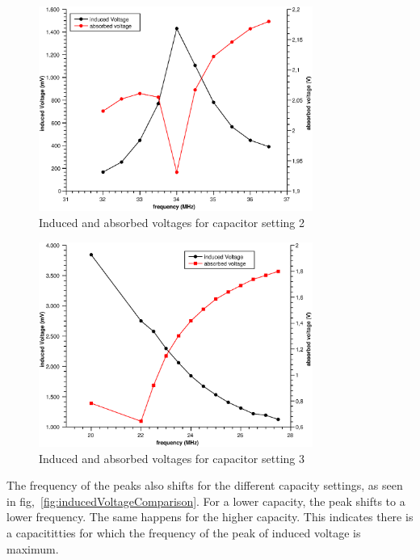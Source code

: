\documentclass{scrartcl}
\begin{document}
\begin{figure}[!ht]
    \centering    
    \includegraphics[width=0.8\textwidth]{Capacitor2.eps}
    \caption{Induced and absorbed voltages for capacitor setting 2}
    \label{fig:VoltageCap2}
\end{figure}

\begin{figure}[!ht]
    \centering    
    \includegraphics[width=0.8\textwidth]{Capacitor3.eps}
    \caption{Induced and absorbed voltages for capacitor setting 3}
    \label{fig:VoltageCap3}
\end{figure}
\FloatBarrier

The frequency of the peaks also shifts for the different capacity settings, as seen in fig,~\ref{fig:inducedVoltageComparison}. For a lower capacity, the peak shifts to a lower frequency. The same happens for the higher capacity. This indicates there is a capacititties for which the frequency of the peak of induced voltage is maximum.  
\end{document}
